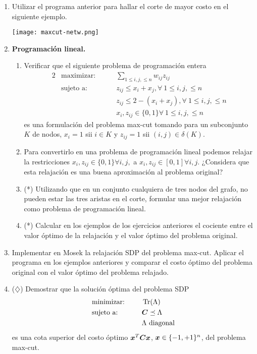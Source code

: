 \documentclass[11pt]{article}
\begin{document}
\begin{enumerate}
\item Utilizar el programa anterior para hallar el corte de mayor costo en el siguiente ejemplo.
\begin{center}
\texttt{[image: maxcut-netw.png]}
\end{center}

\item \textbf{Programación lineal.}
\begin{enumerate}
\item Verificar que el siguiente problema de programación entera
\begin{alignat*}{2}
  & \text{maximizar: } &  &  \sum_{1 \le i, j, \le n} w_{ij} z_{ij}\\
  & \text{sujeto a: }&  \quad & z_{ij} \le x_i + x_j,  \forall \  1 \le i,j, \le n \\
  &&& z_{ij} \le 2 - (x_i + x_j), \forall \ 1 \le i,j, \le n \\
   &&& x_i, z_{ij} \in \{0, 1\} \forall \  1 \le i,j, \le n
\end{alignat*}
es una formulación del problema max-cut tomando para un subconjunto $K$ de nodos, $x_i = 1$ sii $i \in K$ y $z_{ij} = 1$ sii $(i,j) \in \delta(K)$.

\item Para convertirlo en una problema de programación lineal podemos relajar la restricciones $x_i, z_{ij} \in \{0, 1\} \forall i, j,$ a $x_i, z_{ij} \in [0,1] \forall i, j$. ¿Considera que esta relajación es una buena aproximación al problema original?

\item (*) Utilizando que en un conjunto cualquiera de tres nodos del grafo, no pueden estar las tres aristas en el corte, formular una mejor relajación como problema de programación lineal.

\item (*) Calcular en los ejemplos de los ejercicios anteriores el cociente entre el valor óptimo de la relajación y el valor óptimo del problema original.


\end{enumerate}

\item Implementar en Mosek la relajación SDP del problema max-cut. Aplicar el programa en los ejemplos anteriores y comparar el costo óptimo del problema original con el valor óptimo del problema relajado.

\item ($\diamondsuit$) Demostrar que la solución óptima del problema SDP
\begin{alignat*}{2}
  & \text{minimizar: } &  &  \operatorname{Tr}(\Lambda)\\
  & \text{sujeto a: }&  \quad & \bm{C} \preceq \Lambda  \\
  &&& \Lambda \text{ diagonal}
\end{alignat*}
es una cota superior del costo óptimo $\bm{x}^T \bm{C} \bm{x}$, $\bm{x} \in \{-1, +1\}^n$, del problema max-cut.


\end{enumerate}
\end{document}
